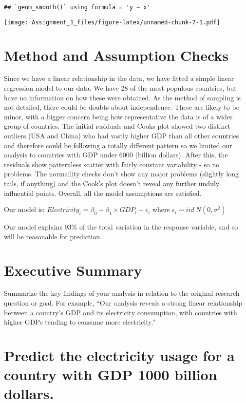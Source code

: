 \documentclass[
]{article}
\begin{document}
\begin{verbatim}
## `geom_smooth()` using formula = 'y ~ x'
\end{verbatim}

\texttt{[image: Assignment\_1\_files/figure-latex/unnamed-chunk-7-1.pdf]}

\section{Method and Assumption
Checks}\label{method-and-assumption-checks}

Since we have a linear relationship in the data, we have fitted a simple
linear regression model to our data. We have 28 of the most populous
countries, but have no information on how these were obtained. As the
method of sampling is not detailed, there could be doubts about
independence. These are likely to be minor, with a bigger concern being
how representative the data is of a wider group of countries. The
initial residuals and Cooks plot showed two distinct outliers (USA and
China) who had vastly higher GDP than all other countries and therefore
could be following a totally different pattern so we limited our
analysis to countries with GDP under 6000 (billion dollars). After this,
the residuals show patternless scatter with fairly constant variability
- so no problems. The normaility checks don't show any major problems
(slightly long tails, if anything) and the Cook's plot doesn't reveal
any further unduly influential points. Overall, all the model
assumptions are satisfied.

Our model is:
\(Electricity_i =\beta_0 +\beta_1\times GDP_i +\epsilon_i\) where
\(\epsilon_i \sim iid ~ N(0,\sigma^2)\)

Our model explains 93\% of the total variation in the response variable,
and so will be reasonable for prediction.

\section{Executive Summary}\label{executive-summary}

Summarize the key findings of your analysis in relation to the original
research question or goal. For example, ``Our analysis reveals a strong
linear relationship between a country's GDP and its electricity
consumption, with countries with higher GDPs tending to consume more
electricity.''

\section{Predict the electricity usage for a country with GDP 1000
billion
dollars.}\label{predict-the-electricity-usage-for-a-country-with-gdp-1000-billion-dollars.}
\end{document}

